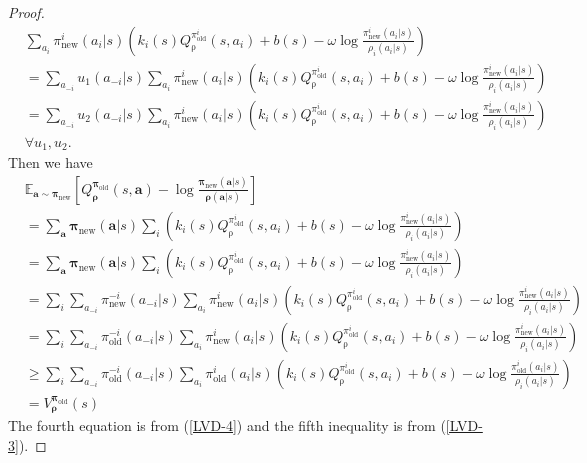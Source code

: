 \documentclass{article}
\begin{document}
\begin{proof}
\begin{equation}
			\begin{split}
				& \sum_{a_i } \pi^{i}_{\operatorname{new}}(a_i|s)  \left( k_i(s) Q_{\operatorname{\rho}}^{\pi^i_{\operatorname{old} }}(s,a_i) + b(s)  - \omega \log \frac{\pi_{\operatorname{new}}^i(a_i|s)}{\rho_i(a_i|s)}  \right) \\
				& = \sum_{a_{-i} } u_1(a_{-i}|s) \sum_{a_i } \pi^{i}_{\operatorname{new}}(a_i|s)  \left( k_i(s) Q_{\operatorname{\rho}}^{\pi^i_{\operatorname{old} }}(s,a_i) + b(s)  - \omega \log \frac{\pi_{\operatorname{new}}^i(a_i|s)}{\rho_i(a_i|s)}  \right) \\
				& = \sum_{a_{-i} } u_2(a_{-i}|s) \sum_{a_i } \pi^{i}_{\operatorname{new}}(a_i|s)  \left( k_i(s) Q_{\operatorname{\rho}}^{\pi^i_{\operatorname{old} }}(s,a_i) + b(s)  - \omega \log \frac{\pi_{\operatorname{new}}^i(a_i|s)}{\rho_i(a_i|s)}  \right) \\
				& \forall u_1, u_2.
			\end{split}
		\end{equation}
		Then we have
		\begin{equation} \label{LVD-6}
			\begin{split}
				& \mathbb{E}_{\bm{a} \sim \bm{\pi}_{\operatorname{new}} } \left[ Q^{\bm{\pi}_{\operatorname{old}}}_{\bm{\rho}}(s,\bm{a}) -  \log \frac{{\bm{\pi}_{\operatorname{new}}}(\bm{a}|s)}{{\bm{\rho}}(\bm{a}|s)} \right]  \\ 
				& = \sum_{\bm{a}} \bm{\pi}_{\operatorname{new}}(\bm{a}|s) \sum_i \left( k_i(s) Q_{\operatorname{\rho}}^{\pi^i_{\operatorname{old} }}(s,a_i) + b(s)  - \omega \log \frac{\pi_{\operatorname{new}}^i(a_i|s)}{\rho_i(a_i|s)}  \right) \\
				& = \sum_{\bm{a}} \bm{\pi}_{\operatorname{new}}(\bm{a}|s) \sum_i \left( k_i(s) Q_{\operatorname{\rho}}^{\pi^i_{\operatorname{old} }}(s,a_i) + b(s)  - \omega \log \frac{\pi_{\operatorname{new}}^i(a_i|s)}{\rho_i(a_i|s)}  \right) \\
				& = \sum_i \sum_{a_{-i} } \pi^{-i}_{\operatorname{new}}(a_{-i}|s) \sum_{a_i } \pi^{i}_{\operatorname{new}}(a_i|s)  \left( k_i(s) Q_{\operatorname{\rho}}^{\pi^i_{\operatorname{old} }}(s,a_i) + b(s)  - \omega \log \frac{\pi_{\operatorname{new}}^i(a_i|s)}{\rho_i(a_i|s)}  \right) \\
				& = \sum_i \sum_{a_{-i} } \pi^{-i}_{\operatorname{old}}(a_{-i}|s) \sum_{a_i } \pi^{i}_{\operatorname{new}}(a_i|s)  \left( k_i(s) Q_{\operatorname{\rho}}^{\pi^i_{\operatorname{old} }}(s,a_i) + b(s)  - \omega \log \frac{\pi_{\operatorname{new}}^i(a_i|s)}{\rho_i(a_i|s)}  \right) \\
				& \ge \sum_i \sum_{a_{-i} } \pi^{-i}_{\operatorname{old}}(a_{-i}|s) \sum_{a_i } \pi^{i}_{\operatorname{old}}(a_i|s)  \left( k_i(s) Q_{\operatorname{\rho}}^{\pi^i_{\operatorname{old} }}(s,a_i) + b(s)  - \omega \log \frac{\pi_{\operatorname{old}}^i(a_i|s)}{\rho_i(a_i|s)}  \right) \\
				& = V^{\bm{\pi}_{\operatorname{old}}}_{\bm{\rho}}(s)
			\end{split}
		\end{equation}
		The fourth equation is from (\ref{LVD-4}) and the fifth inequality is from (\ref{LVD-3}).
		

\end{proof}
\end{document}
